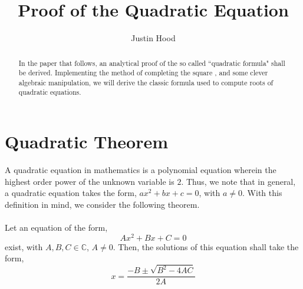 \documentclass[12pt]{amsart}
\theoremstyle{definition}
\begin{document}
\title[]{Proof of the Quadratic Equation}
\author{Justin Hood}
\address{}


\begin{abstract}
In the paper that follows, an analytical proof of the so called ``quadratic formula" shall be derived.  Implementing the method of completing the square \cite{complete}, and some clever algebraic manipulation, we will derive the classic formula used to compute roots of quadratic equations.
\end{abstract}

\maketitle

\section{Quadratic Theorem}
A quadratic equation in mathematics is a polynomial equation wherein the highest order power of the unknown variable is $2$. Thus, we note that in general, a quadratic equation takes the form, $ax^2+bx+c=0$, with $a\neq 0$. With this definition in mind, we consider the following theorem.
\hfill\\\\
Let an equation of the form,
\begin{equation}\label{quad}
Ax^2+Bx+C=0
\end{equation}
exist, with $A,B,C\in\mathbb{C}$, $A\neq 0$. Then, the solutions of this equation shall take the form,
\[x=\frac{-B\pm\sqrt{B^2-4AC}}{2A}\]
\hfill\\
\end{document}
